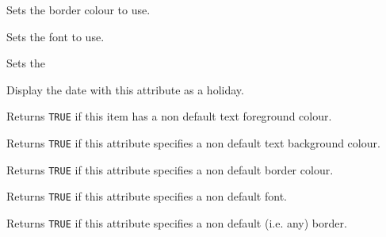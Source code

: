 Sets the border colour to use.

\label{wxcalendardateattrsetfont}


Sets the font to use.

\label{wxcalendardateattrsetborder}


Sets the 

\label{wxcalendardateattrsetholiday}


Display the date with this attribute as a holiday.

\label{wxcalendardateattrhastextcolour}


Returns {\tt TRUE} if this item has a non default text foreground colour.

\label{wxcalendardateattrhasbackgroundcolour}


Returns {\tt TRUE} if this attribute specifies a non default text background colour.

\label{wxcalendardateattrhasbordercolour}


Returns {\tt TRUE} if this attribute specifies a non default border colour.

\label{wxcalendardateattrhasfont}


Returns {\tt TRUE} if this attribute specifies a non default font.

\label{wxcalendardateattrhasborder}


Returns {\tt TRUE} if this attribute specifies a non default (i.e. any) border.

\label{wxcalendardateattrisholiday}


